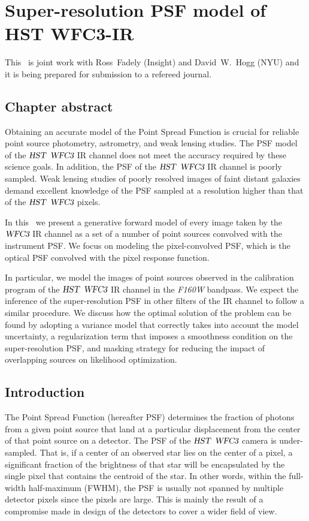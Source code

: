 
\chapter{Super-resolution PSF model of HST WFC3-IR}

This \paper\ is joint work with Ross~Fadely (Insight) and David~W.~Hogg (NYU) and it is being prepared for submission to a refereed journal. 

\section{Chapter abstract}

Obtaining an accurate model of the Point Spread Function is crucial for reliable point source photometry, astrometry, and weak lensing studies.
The PSF model of the ${\textsl{HST}}$ ${\textsl{WFC3}}$ IR channel does not meet the accuracy required by these science goals. 
In addition, the PSF of the ${\textsl{HST}}$ ${\textsl{WFC3}}$ IR channel is poorly sampled. Weak lensing studies of poorly resolved images of faint distant galaxies demand 
excellent knowledge of the PSF sampled at a resolution higher than that of the ${\textsl{HST}}$ ${\textsl{WFC3}}$ pixels.

In this \paper\, we present a generative forward model of every image taken by the ${\textsl{WFC3}}$ IR channel as a set of a number of point sources convolved
with the instrument PSF. We focus on modeling the pixel-convolved PSF, which is the optical PSF convolved with the pixel response function. 

In particular, we model the images of point sources observed in the calibration program of the ${\textsl{HST}}$ ${\textsl{WFC3}}$ IR channel in the \emph{F160W} bandpass. 
We expect the inference of the super-resolution PSF in other filters of the IR channel to follow a similar procedure. 
We discuss how the optimal solution of the problem can be found by adopting a variance model that correctly takes into account the model 
uncertainty, a regularization term that imposes a smoothness condition on the super-resolution PSF, and masking strategy for reducing the impact of overlapping sources on 
likelihood optimization. 

\section{Introduction}

The Point Spread Function (hereafter PSF) determines the fraction of photons from a given point source that land at a particular displacement 
from the center of that point source on a detector. The PSF of the ${\textsl{HST}}$ ${\textsl{WFC3}}$ camera is under-sampled. That is, if a center of an observed star lies 
on the center of a pixel, a significant fraction of the brightness of that star will be 
encapsulated by the single pixel that contains the centroid of the star.
In other words, within the full-width half-maximum (FWHM), the PSF is usually not spanned by multiple detector pixels since the pixels are large. 
This is mainly the result of a compromise made in design of the detectors to cover a wider field of view.

